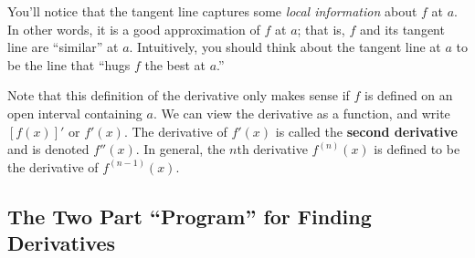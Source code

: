 \documentclass{article}
\theoremstyle{definition}
\theoremstyle{definition}
\begin{document}
\begin{multicols}{2}
{

}

\end{multicols}


You'll notice that the tangent line captures some \textit{local information} about $f$ at $a$. In other words, it is a good approximation of $f$ at $a$; that is, $f$ and its tangent line are ``similar'' at $a$. Intuitively, you should think about the tangent line at $a$ to be the line that ``hugs $f$ the best at $a$.''

Note that this definition of the derivative only makes sense if $f$ is defined on an open interval containing $a$. We can view the derivative as a function, and write $[f(x)]'$ or $f'(x)$. The derivative of $f'(x)$ is called the \textbf{second derivative} and is denoted $f''(x)$. In general, the $n$th derivative $f^{(n)}(x)$ is defined to be the derivative of $f^{(n-1)}(x)$.

\subsection{The Two Part ``Program'' for Finding Derivatives}
\end{document}
